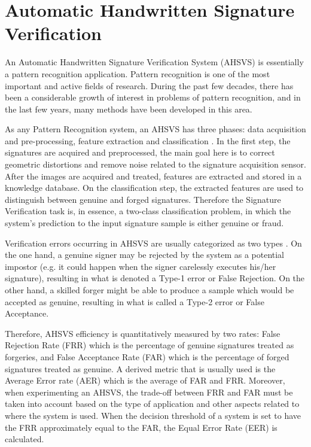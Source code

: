 \section{Automatic Handwritten Signature Verification}
An Automatic Handwritten Signature Verification System (AHSVS) is essentially a pattern recognition application. Pattern recognition is one of the most important and active fields of research. During the past few decades, there has been a considerable growth of interest in problems of pattern recognition, and in the last few years, many methods have been developed in this area. 

As any Pattern Recognition system, an AHSVS has three phases: data acquisition and pre-processing, feature extraction and classification \cite{impedovo2008state}. In the first step, the signatures are acquired and preprocessed, the main goal here is to correct geometric distortions and remove noise related to the signature acquisition sensor. After the images are acquired and treated, features are extracted and stored in a knowledge database. On the classification step, the extracted features are used to distinguish between genuine and forged signatures. Therefore the Signature Verification task is, in essence, a two-class classification problem, in which the system's prediction to the input signature sample is either genuine or fraud.

Verification errors occurring in AHSVS are usually categorized as two types \cite{fairhurst1997signature}. On the one hand, a genuine signer may be rejected by the system as a potential impostor (e.g. it could happen when the signer carelessly executes his/her signature), resulting in what is denoted a Type-1 error or False
Rejection. On the other hand, a skilled forger might be able to produce a sample which would be accepted as genuine, resulting in what is called a Type-2 error or False Acceptance. 

Therefore, AHSVS efficiency is quantitatively measured by two rates: False Rejection Rate (FRR) which is the percentage of genuine signatures treated as forgeries, and False
Acceptance Rate (FAR) which is the percentage of forged signatures treated as
genuine. A derived metric that is usually used is the Average Error rate (AER) which is the average of FAR and FRR. Moreover, when experimenting an AHSVS, the trade-off between FRR and FAR must be taken into account based on the type of application and other aspects related to where the system is used. When the decision threshold of a system is set to have the FRR approximately equal to the FAR, the Equal Error Rate (EER) is calculated.

